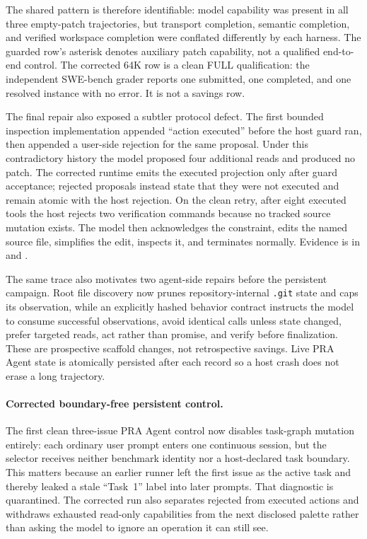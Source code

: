 \documentclass[11pt]{article}
\begin{document}
The shared pattern is therefore identifiable: model capability was present in
all three empty-patch trajectories, but transport completion, semantic
completion, and verified workspace completion were conflated differently by
each harness.  The guarded row's asterisk denotes auxiliary patch capability,
not a qualified end-to-end control.  The corrected 64K row is a clean FULL
qualification: the independent SWE-bench grader reports one submitted, one
completed, and one resolved instance with no error.  It is not a savings row.

The final repair also exposed a subtler protocol defect.  The first bounded
inspection implementation appended ``action executed'' before the host guard
ran, then appended a user-side rejection for the same proposal.  Under this
contradictory history the model proposed four additional reads and produced no
patch.  The corrected runtime emits the executed projection only after guard
acceptance; rejected proposals instead state that they were not executed and
remain atomic with the host rejection.  On the clean retry, after eight
executed tools the host rejects two verification commands because no tracked
source mutation exists.  The model then acknowledges the constraint, edits the
named source file, simplifies the edit, inspects it, and terminates normally.
Evidence is in
 and
.

The same trace also motivates two agent-side repairs before the persistent
campaign.  Root file discovery now prunes repository-internal \texttt{.git}
state and caps its observation, while an explicitly hashed behavior contract
instructs the model to consume successful observations, avoid identical calls
unless state changed, prefer targeted reads, act rather than promise, and
verify before finalization.  These are prospective scaffold changes, not
retrospective savings.  Live PRA Agent state is atomically persisted after
each record so a host crash does not erase a long trajectory.

\paragraph{Corrected boundary-free persistent control.}
The first clean three-issue PRA Agent control now disables task-graph mutation
entirely: each ordinary user prompt enters one continuous session, but the
selector receives neither benchmark identity nor a host-declared task
boundary.  This matters because an earlier runner left the first issue as the
active task and thereby leaked a stale ``Task~1'' label into later prompts.
That diagnostic is quarantined.  The corrected run also separates rejected
from executed actions and withdraws exhausted read-only capabilities from the
next disclosed palette rather than asking the model to ignore an operation it
can still see.
\end{document}
